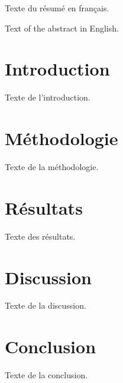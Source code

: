 \begin{Article}[Auteur={Nom Prénom, Université XYZ}, Titre={Titre de l'article}]

    \begin{resume}
    Texte du résumé en français.
    \end{resume}

    \begin{resumeENG}
    Text of the abstract in English.
    \end{resumeENG}




    \section{Introduction}
    Texte de l'introduction.

    \section{Méthodologie}
    Texte de la méthodologie.

    \section{Résultats}
    Texte des résultats.

    \section{Discussion}
    Texte de la discussion.

    \section{Conclusion}
    Texte de la conclusion.

    \printbibliography

\end{Article}